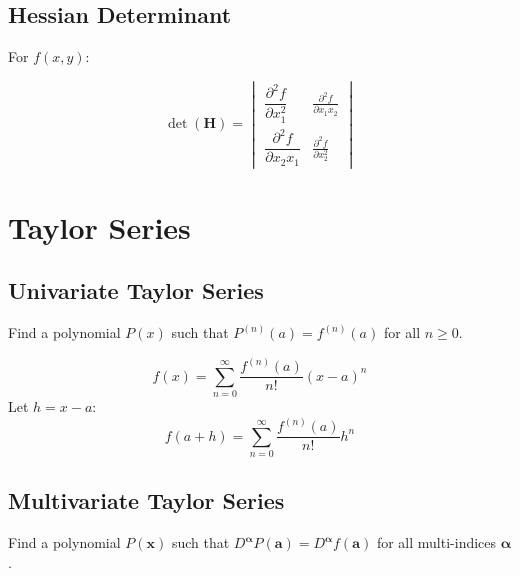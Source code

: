 \documentclass{article}
\begin{document}
\subsection{Hessian Determinant}

For $f(x, y)$:

\[
    \det(\mathbf{H}) = \begin{vmatrix}
       \dfrac{\partial^2 f}{\partial x_1^2} & \frac{\partial^2 f}{\partial x_1 x_2} \\
       \dfrac{\partial^2 f}{\partial x_2 x_1} & \frac{\partial^2 f}{\partial x_2^2}
    \end{vmatrix}
\]


\newpage
\section{Taylor Series}

\subsection{Univariate Taylor Series}

Find a polynomial $P(x)$ such that $P^{(n)}(a) = f^{(n)}(a)$ for all $n \geq 0$.

\[
    f(x) = \sum_{n=0}^{\infty} \frac{f^{(n)}(a)}{n!}(x - a)^n
\]
Let $h = x - a$:
\[
    f(a + h) = \sum_{n=0}^{\infty} \frac{f^{(n)}(a)}{n!}h^n
\]

\subsection{Multivariate Taylor Series}

Find a polynomial $P(\mathbf{x})$ such that $D^{\boldsymbol{\alpha}} P(\mathbf{a}) = D^{\boldsymbol{\alpha}} f(\mathbf{a})$ for all multi-indices $\boldsymbol{\alpha}$.
\end{document}
